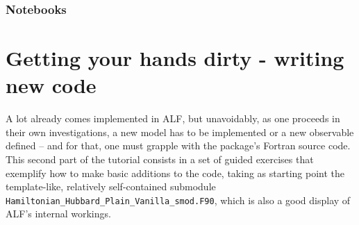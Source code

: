 \documentclass[10pt,modern]{scrartcl}
\numberwithin{exerciseitem}{exercise} %
\begin{document}


\section*{Notebooks}












\newpage

\part{Getting your hands dirty - writing new code}

A lot already comes implemented in ALF, but unavoidably, as one proceeds in their own investigations, a new model has to be implemented or a new observable defined -- and for that, one must grapple with the package's Fortran source code. 
This second part of the tutorial consists in a set of guided exercises that exemplify how to make basic additions to the code, taking as starting point the template-like, relatively self-contained submodule \texttt{Hamiltonian\_Hubbard\_Plain\_Vanilla\_smod.F90}, which is also a good display of ALF's internal workings.
\end{document}
